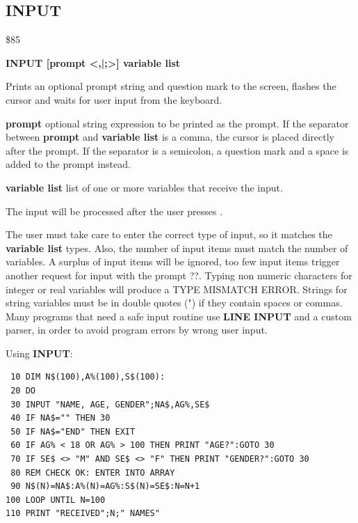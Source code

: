 
\newpage
\subsection{INPUT}
\begin{description}[leftmargin=2cm,style=nextline]
\item [Token:] \$85
\item [Format:] {\bf INPUT [prompt <,|;>] variable list}
\item [Usage:] Prints an optional
               prompt string and question mark to the screen,
               flashes the cursor and waits for user input
               from the keyboard.

               {\bf prompt} optional string expression to be printed
               as the prompt.
               If the separator between {\bf prompt} and {\bf variable list}
               is a comma, the cursor is placed directly after
               the prompt. If the separator is a semicolon,
               a question mark and a space is added to the prompt instead.

               {\bf variable list} list of one or more
               variables that receive the input.

               The input will be processed after the user presses .

\item [Remarks:] The user must take care to enter the correct
               type of input, so it matches the {\bf variable list} types.
               Also, the number of input items must match the number
               of variables. A surplus of input items will be ignored,
               too few input items trigger another request for input
               with the prompt ??.
               Typing non numeric characters for integer or real
               variables will produce a TYPE MISMATCH ERROR.
               Strings for string variables must be in double quotes (")
               if they contain spaces or commas.
               Many programs that need a safe input routine use
               {\bf LINE INPUT} and a custom parser, in order
               to avoid program errors by wrong user input.

\item [Example:] Using {\bf INPUT}:
\begin{tcolorbox}[colback=black,coltext=white]
\verbatimfont{\codefont}
\begin{verbatim}
 10 DIM N$(100),A%(100),S$(100):
 20 DO
 30 INPUT "NAME, AGE, GENDER";NA$,AG%,SE$
 40 IF NA$="" THEN 30
 50 IF NA$="END" THEN EXIT
 60 IF AG% < 18 OR AG% > 100 THEN PRINT "AGE?":GOTO 30
 70 IF SE$ <> "M" AND SE$ <> "F" THEN PRINT "GENDER?":GOTO 30
 80 REM CHECK OK: ENTER INTO ARRAY
 90 N$(N)=NA$:A%(N)=AG%:S$(N)=SE$:N=N+1
100 LOOP UNTIL N=100
110 PRINT "RECEIVED";N;" NAMES"
\end{verbatim}
\end{tcolorbox}
\end{description}

